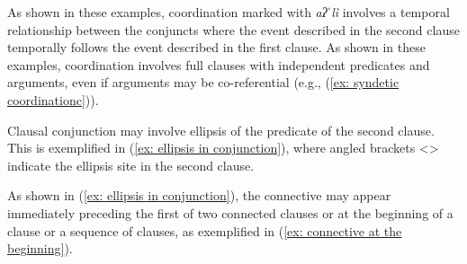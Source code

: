                 \label{ex: syndetic coordinatione}
    \z
\z

As shown in these examples, coordination marked with \textit{aʔˈlì} involves a temporal relationship between the conjuncts where the event described in the second clause temporally follows the event described in the first clause. As shown in these examples, coordination involves full clauses with independent predicates and arguments, even if arguments may be co-referential (e.g., (\ref{ex: syndetic coordinationc})).

Clausal conjunction may involve ellipsis of the predicate of the second clause. This is exemplified in (\ref{ex: ellipsis in conjunction}), where angled brackets <> indicate the ellipsis site in the second clause.

\ea\label{ex: ellipsis in conjunction}

    \z
\z

As shown in (\ref{ex: ellipsis in conjunction}), the connective may appear immediately preceding the first of two connected clauses or at the beginning of a clause or a sequence of clauses, as exemplified in (\ref{ex: connective at the beginning}).

